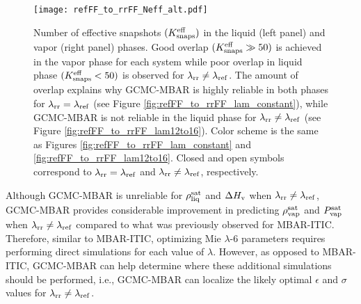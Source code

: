 \documentclass[journal=jced,manuscript=article]{achemso}
\begin{document}
\begin{figure}[H]
	\centering
	\texttt{[image: refFF\_to\_rrFF\_Neff\_alt.pdf]}
	\caption{Number of effective snapshots $(K_{\rm snaps}^{\rm eff})$ in the liquid (left panel) and vapor (right panel) phases. Good overlap $(K_{\rm snaps}^{\rm eff} \gg 50)$ is achieved in the vapor phase for each system while poor overlap in liquid phase $(K_{\rm snaps}^{\rm eff} < 50)$ is observed for $\lambda_{\rm rr} \neq \lambda_{\rm ref}$. The amount of overlap explains why GCMC-MBAR is highly reliable in both phases for  $\lambda_{\rm rr} = \lambda_{\rm ref}$ (see Figure \ref{fig:refFF_to_rrFF_lam_constant}), while GCMC-MBAR is not reliable in the liquid phase for $\lambda_{\rm rr} \neq \lambda_{\rm ref}$ (see Figure \ref{fig:refFF_to_rrFF_lam12to16}). Color scheme is the same as Figures \ref{fig:refFF_to_rrFF_lam_constant} and \ref{fig:refFF_to_rrFF_lam12to16}. Closed and open symbols correspond to $\lambda_{\rm rr} = \lambda_{\rm ref}$ and $\lambda_{\rm rr} \neq \lambda_{\rm ref}$, respectively.}
	\label{fig:Neff}
\end{figure} 


Although GCMC-MBAR is unreliable for $\rho_{\rm liq}^{\rm sat}$ and $\Delta H_{\rm v}$ when $\lambda_{\rm rr} \neq \lambda_{\rm ref}$, GCMC-MBAR provides considerable improvement in predicting $\rho_{\rm vap}^{\rm sat}$ and $P_{\rm vap}^{\rm sat}$ when $\lambda_{\rm rr} \neq \lambda_{\rm ref}$ compared to what was previously observed for MBAR-ITIC.\cite{Postdoc_1} Therefore, similar to MBAR-ITIC, optimizing Mie $\lambda$-6 parameters requires performing direct simulations for each value of $\lambda$. However, as opposed to MBAR-ITIC, GCMC-MBAR can help determine where these additional simulations should be performed, i.e., GCMC-MBAR can localize the likely optimal $\epsilon$ and $\sigma$ values for $\lambda_{\rm rr} \neq \lambda_{\rm ref}$.
\end{document}
